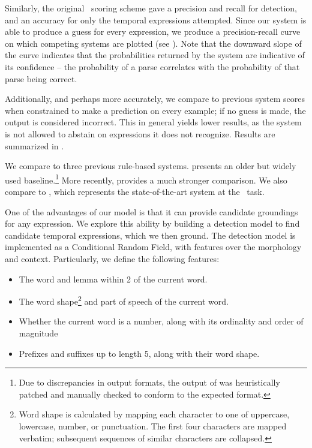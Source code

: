 
Similarly, the original \tempeval\ scoring scheme gave a precision 
	and recall for detection, and an accuracy for only the temporal expressions 
	attempted.
Since our system is able to produce a guess for every expression, we produce
	a precision-recall curve on which competing systems are plotted
	(see ).
Note that the downward slope of the curve indicates that the probabilities
	returned by the system are indicative of its confidence -- the probability
	of a parse correlates with the probability of that parse being correct.

Additionally, and perhaps more accurately, we compare to 
	previous system scores when constrained to make a prediction on every
	example; if no guess is made, the output is considered incorrect.
This in general yields lower results, as the system is not allowed to
	abstain on expressions it does not recognize.
Results are summarized in .

We compare to three previous rule-based systems.
 \cite{key:2000mani-temporal} presents an older but widely
	used baseline.\footnote{
		Due to discrepancies in output formats, 
			the output of  was heuristically patched
			and manually checked to conform to the expected format.
	}
More recently,  \cite{key:2012chang-temporal} 
	provides a much stronger comparison.
We also compare to  \cite{key:2010strotgen-temporal}, 
	which represents the state-of-the-art system at the \tempeval\ task.

One of the advantages of our model is that it can provide candidate groundings for any
	expression.
We explore this ability by building a detection model to find candidate temporal
	expressions, which we then ground.
The detection model is implemented as a Conditional Random Field, with features over the
	morphology and context.
Particularly, we define the following features:
\begin{itemize}
\item The word and lemma within 2 of the current word.
\item The word shape\footnote{
		Word shape is calculated by mapping each character to one of uppercase, lowercase, number,
			or punctuation.
		The first four characters are mapped verbatim; subsequent sequences of similar characters
			are collapsed.
	}
	and part of speech of the current word.
\item Whether the current word is a number, along with its ordinality and order of magnitude
\item Prefixes and suffixes up to length 5, along with their word shape.
\end{itemize}

